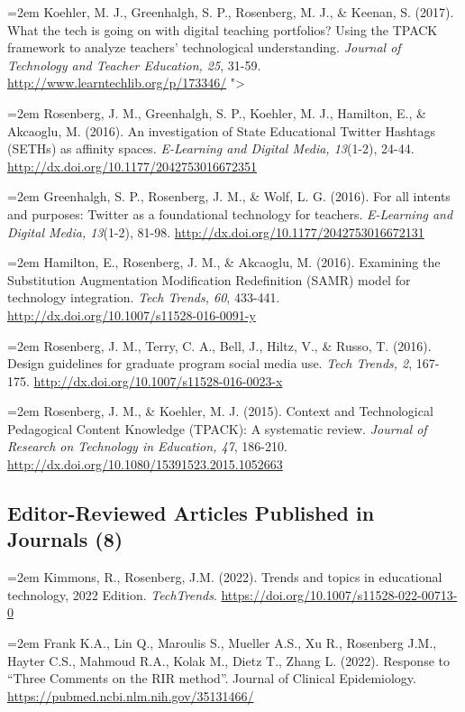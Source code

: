 \documentclass[
  14,
]{article}
\begin{document}
\hangindent=2em Koehler, M. J., Greenhalgh, S. P., Rosenberg, M. J., \&
Keenan, S. (2017). What the tech is going on with digital teaching
portfolios? Using the TPACK framework to analyze teachers' technological
understanding. \emph{Journal of Technology and Teacher Education, 25},
31-59. \url{http://www.learntechlib.org/p/173346/} "\textgreater{}

\hangindent=2em Rosenberg, J. M., Greenhalgh, S. P., Koehler, M. J.,
Hamilton, E., \& Akcaoglu, M. (2016). An investigation of State
Educational Twitter Hashtags (SETHs) as affinity spaces.
\emph{E-Learning and Digital Media, 13}(1-2), 24-44.
\url{http://dx.doi.org/10.1177/2042753016672351}

\hangindent=2em Greenhalgh, S. P., Rosenberg, J. M., \& Wolf, L. G.
(2016). For all intents and purposes: Twitter as a foundational
technology for teachers. \emph{E-Learning and Digital Media, 13}(1-2),
81-98. \url{http://dx.doi.org/10.1177/2042753016672131}

\hangindent=2em Hamilton, E., Rosenberg, J. M., \& Akcaoglu, M. (2016).
Examining the Substitution Augmentation Modification Redefinition (SAMR)
model for technology integration. \emph{Tech Trends, 60}, 433-441.
\url{http://dx.doi.org/10.1007/s11528-016-0091-y}

\hangindent=2em Rosenberg, J. M., Terry, C. A., Bell, J., Hiltz, V., \&
Russo, T. (2016). Design guidelines for graduate program social media
use. \emph{Tech Trends, 2}, 167-175.
\url{http://dx.doi.org/10.1007/s11528-016-0023-x}

\hangindent=2em Rosenberg, J. M., \& Koehler, M. J. (2015). Context and
Technological Pedagogical Content Knowledge (TPACK): A systematic
review. \emph{Journal of Research on Technology in Education, 47},
186-210. \url{http://dx.doi.org/10.1080/15391523.2015.1052663}

\hypertarget{editor-reviewed-articles-published-in-journals-8}{%
\subsection{Editor-Reviewed Articles Published in Journals
(8)}\label{editor-reviewed-articles-published-in-journals-8}}

\hangindent=2em Kimmons, R., Rosenberg, J.M. (2022). Trends and topics
in educational technology, 2022 Edition. \emph{TechTrends}.
\url{https://doi.org/10.1007/s11528-022-00713-0}

\hangindent=2em Frank K.A., Lin Q., Maroulis S., Mueller A.S., Xu R.,
Rosenberg J.M., Hayter C.S., Mahmoud R.A., Kolak M., Dietz T., Zhang L.
(2022). Response to ``Three Comments on the RIR method''. Journal of
Clinical Epidemiology. \url{https://pubmed.ncbi.nlm.nih.gov/35131466/}
\end{document}
